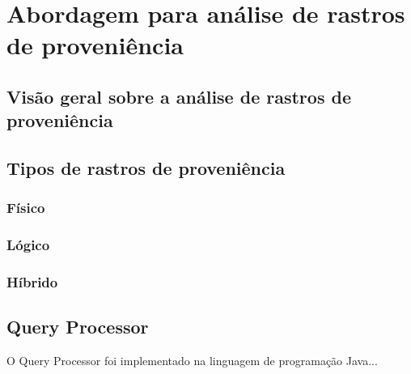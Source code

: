 
\chapter{Abordagem para análise de rastros de proveniência}%
\label{chap:rastros-de-proveniencia}


\section{Visão geral sobre a análise de rastros de proveniência}

 
\section{Tipos de rastros de proveniência}


\subsection{Físico}

\subsection{Lógico}

\subsection{Híbrido}


\section{Query Processor}

O Query Processor foi implementado na linguagem de programação Java...




